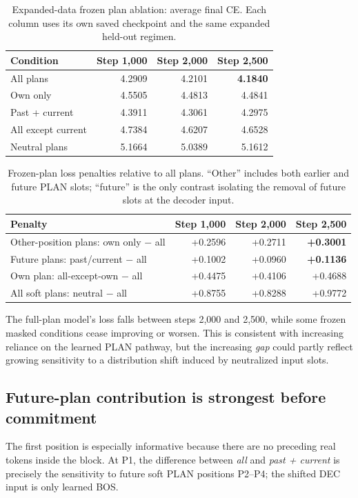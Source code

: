 \documentclass[11pt,letterpaper]{article}
\begin{document}
\begin{table}[ht]
\centering\small
\caption{Expanded-data frozen plan ablation: average final CE. Each column uses its own saved checkpoint and the same expanded held-out regimen.}
\label{tab:ablation}
\begin{tabular}{@{}lrrr@{}}\toprule
Condition & Step 1,000 & Step 2,000 & Step 2,500\\\midrule
All plans & 4.2909 & 4.2101 & \textbf{4.1840}\\
Own only & 4.5505 & 4.4813 & 4.4841\\
Past + current & 4.3911 & 4.3061 & 4.2975\\
All except current & 4.7384 & 4.6207 & 4.6528\\
Neutral plans & 5.1664 & 5.0389 & 5.1612\\\bottomrule
\end{tabular}
\end{table}

\begin{table}[ht]
\centering\small
\caption{Frozen-plan loss penalties relative to all plans. ``Other'' includes both earlier and future PLAN slots; ``future'' is the only contrast isolating the removal of future slots at the decoder input.}
\label{tab:penalties}
\begin{tabular}{@{}lrrr@{}}\toprule
Penalty & Step 1,000 & Step 2,000 & Step 2,500\\\midrule
Other-position plans: own only $-$ all & +0.2596 & +0.2711 & \textbf{+0.3001}\\
Future plans: past/current $-$ all & +0.1002 & +0.0960 & \textbf{+0.1136}\\
Own plan: all-except-own $-$ all & +0.4475 & +0.4106 & +0.4688\\
All soft plans: neutral $-$ all & +0.8755 & +0.8288 & +0.9772\\\bottomrule
\end{tabular}
\end{table}

The full-plan model's loss falls between steps 2,000 and 2,500, while some frozen masked conditions cease improving or worsen. This is consistent with increasing reliance on the learned PLAN pathway, but the increasing \emph{gap} could partly reflect growing sensitivity to a distribution shift induced by neutralized input slots.

\subsection{Future-plan contribution is strongest before commitment}
The first position is especially informative because there are no preceding real tokens inside the block. At P1, the difference between \emph{all} and \emph{past + current} is precisely the sensitivity to future soft PLAN positions P2--P4; the shifted DEC input is only learned BOS.
\end{document}
